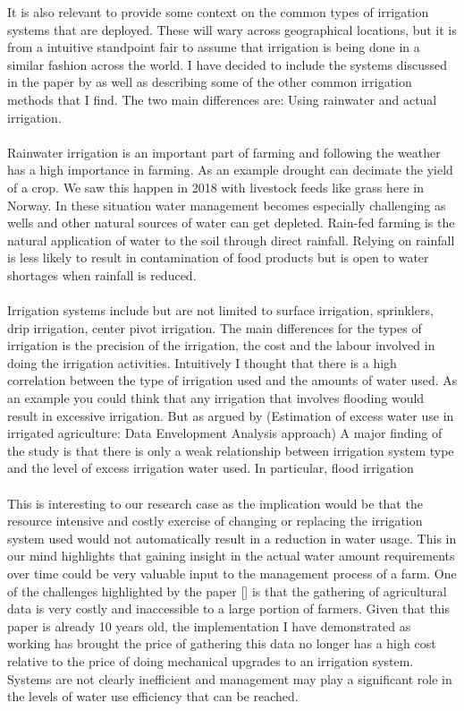 \documentclass[]{uiophd}
\begin{document}
It is also relevant to provide some context on the common types of irrigation systems that are deployed. These will wary across geographical locations, but it is from a intuitive standpoint fair to assume that irrigation is being done in a similar fashion across the world. I have decided to include the systems discussed in the paper by \parencite{LILIENFELD200773} as well as describing some of the  other common irrigation methods that I find. The two main differences are: Using rainwater and actual irrigation. 
\\\\
Rainwater irrigation is an important part of farming and following the weather has a high importance in farming. As an example drought can decimate the yield of a crop. We saw this happen in 2018 with livestock feeds like grass here in Norway. In these situation water management becomes especially challenging as wells and other natural sources of water can get depleted. Rain-fed farming is the natural application of water to the soil through direct rainfall. Relying on rainfall is less likely to result in contamination of food products but is open to water shortages when rainfall is reduced. \parencite{cdc}
\\\\
Irrigation systems include but are not limited to surface irrigation, sprinklers, drip irrigation, center pivot irrigation. The main differences for the types of irrigation is the precision of the irrigation, the cost and the labour involved in doing the irrigation activities. Intuitively I thought that there is a high correlation between the type of irrigation used and the amounts of water used. As an example you could think that any irrigation that involves flooding would result in excessive irrigation. But as argued by (Estimation of excess water use in irrigated agriculture: Data Envelopment Analysis approach) A major finding of the study is that there is only a weak relationship between irrigation system type and the level of excess irrigation water used. In particular, flood irrigation \parencite{LILIENFELD200773}
\\\\
This is interesting to our research case as the implication would be that the resource intensive and costly exercise of changing or replacing the irrigation system used would not automatically result in a reduction in water usage. This in our mind highlights that gaining insight in the actual water amount requirements over time could be very valuable input to the management process of a farm. One of  the challenges highlighted by the paper [] is that the gathering of agricultural data is very costly and inaccessible to a large portion of farmers. Given that this paper is already 10 years old, the implementation I have demonstrated as working has brought the price of gathering this data no longer has a high cost relative to the price of doing mechanical upgrades to an irrigation system. Systems are not clearly inefficient and management may play a significant role in the levels of water use efficiency that can be reached. \parencite{LILIENFELD200773}
\end{document}
